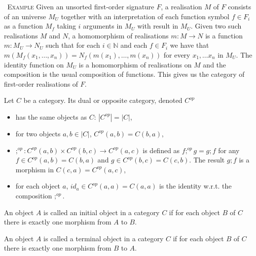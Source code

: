 \documentclass[10pt, a4paper]{isov2}
\renewenvironment{example}[0]{\ \newline \textsc{Example}\quad }{}
\begin{document}
\begin{example}
Given an unsorted first-order signature $F$,
a realisation $M$
of $F$
consists of an universe $M_U$
together with an interpretation of each function symbol $f \in F_i$
as a function $M_f$
taking $i$
arguments in $M_U$
with result in $M_U$.
Given two such realisations $M$
and $N$,
a homomorphism of realisations $m : M \to N$
is a function $m: M_U \to N_U$
such that for each $i\in \mathbb{N}$
and each $f\in F_i$
we have that $m(M_f(x_1,\ldots, x_n)) = N_f(m(x_1), \ldots, m(x_n))$
for every $x_1,\ldots x_n$
in $M_U$.
The identity function on $M_U$
is a homomorphism of realisations on $M$
and the composition is the usual composition of functions. This gives us
the category of first-order realisations of $F$.
\end{example}

\begin{definition}
Let $C$ be a category. Its dual or opposite category, denoted $C^{\mathit{op}}$ 
\begin{itemize}
  \item has the same objects as $C$: $|C^{\mathit{op}}| = |C|$,

  \item for two objects $a,b\in |C|$, $C^{\mathit{op}}(a,b) = C(b,a)$,

  \item ${;}^{\mathit{op}} : C^{\mathit{op}}(a,b) \times C^{\mathit{op}}(b,c) \to C^{\mathit{op}}(a,c)$
is defined as $f;^{\mathit{op}} g = g;f$
for any $f\in C^{\mathit{op}}(a,b) = C(b,a)$
and $g\in C^{\mathit{op}}(b,c) = C(c,b)$.
The result $g;f$ is a morphism in $C(c,a) = C^{\mathit{op}}(a,c)$,
  \item for each object $a$,
$id_a \in C^{\mathit{op}}(a,a) = C(a,a)$
is the identity w.r.t. the composition ${;}^{\mathit{op}}$.
\end{itemize}
\end{definition}

\begin{definition}
An object $A$ is called an initial object in a category 
$C$ if for each object $B$ of $C$ there is
exactly one morphism from $A$ to $B$.
\end{definition}

\begin{definition}
An object $A$ is called a terminal object in a category 
$C$ if for each object $B$ of $C$ there is
exactly one morphism from $B$ to $A$.
\end{definition}
\end{document}
